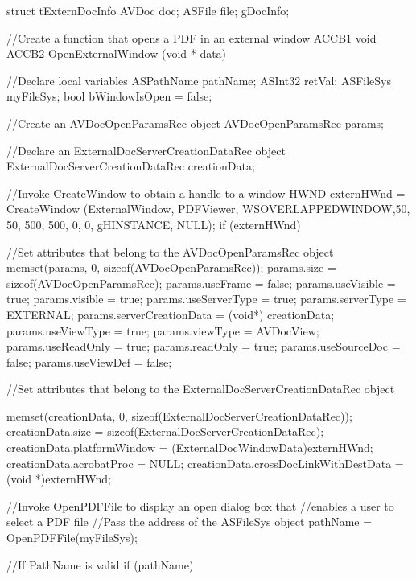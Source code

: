 \documentclass[letterpaper,12pt,english,openany,oneside]{sphinxmanual}
\begin{document}
\begin{sphinxVerbatim}[commandchars=\\\{\}]
   struct t\PYGZus{}ExternDocInfo
   \PYGZob{}
      AVDoc doc;
      ASFile file;
   \PYGZcb{} gDocInfo;

//Create a function that opens a PDF in an external window
   ACCB1 void ACCB2 OpenExternalWindow (void * data)

   \PYGZob{}

//Declare local variables
   ASPathName pathName;
   ASInt32 retVal;
   ASFileSys myFileSys;
   bool bWindowIsOpen = false;

//Create an AVDocOpenParamsRec object
   AVDocOpenParamsRec params;


//Declare an ExternalDocServerCreationDataRec object
   ExternalDocServerCreationDataRec creationData;

//Invoke CreateWindow to obtain a handle to a window
   HWND externHWnd = CreateWindow (\PYGZdq{}ExternalWindow\PYGZdq{}, \PYGZdq{}PDFViewer\PYGZdq{},
   WS\PYGZus{}OVERLAPPEDWINDOW,50, 50, 500, 500, 0, 0, gHINSTANCE, NULL);
   if (externHWnd)
   \PYGZob{}

//Set attributes that belong to the AVDocOpenParamsRec object
   memset(\PYGZam{}params, 0, sizeof(AVDocOpenParamsRec));
   params.size = sizeof(AVDocOpenParamsRec);
   params.useFrame = false;
   params.useVisible = true;
   params.visible = true;
   params.useServerType = true;
   params.serverType = \PYGZdq{}EXTERNAL\PYGZdq{};
   params.serverCreationData = (void*) \PYGZam{}creationData;
   params.useViewType = true;
   params.viewType = \PYGZdq{}AVDocView\PYGZdq{};
   params.useReadOnly = true;
   params.readOnly = true;
   params.useSourceDoc = false;
   params.useViewDef = false;

//Set attributes that belong to the ExternalDocServerCreationDataRec object

   memset(\PYGZam{}creationData, 0, sizeof(ExternalDocServerCreationDataRec));
   creationData.size = sizeof(ExternalDocServerCreationDataRec);
   creationData.platformWindow = (ExternalDocWindowData)externHWnd;
   creationData.acrobatProc = NULL;
   creationData.crossDocLinkWithDestData = (void *)externHWnd;

//Invoke OpenPDFFile to display an open dialog box that
//enables a user to select a PDF file
//Pass the address of the ASFileSys object
   pathName = OpenPDFFile(\PYGZam{}myFileSys);

//If PathName is valid
   if (pathName) \PYGZob{}


\end{sphinxVerbatim}
\end{document}
